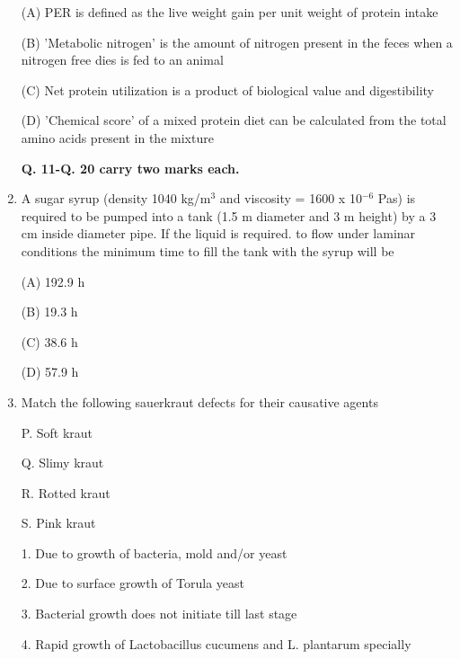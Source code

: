 \documentclass[journal]{IEEEtran}
\begin{document}
\begin{enumerate}
{(A) PER is defined as the live weight gain per unit weight of protein intake

(B) 'Metabolic nitrogen' is the amount of nitrogen present in the feces when a nitrogen free dies is fed to an animal

(C) Net protein utilization is a product of biological value and digestibility

(D) 'Chemical score' of a mixed protein diet can be calculated from the total amino acids present in the mixture}
\begin{center}
\textbf{Q. 11-Q. 20 carry two marks each.}
\end{center}
\item {A sugar syrup (density 1040 kg/m$^3$ and viscosity = 1600 x 10$^{-6}$ Pas) is required to be pumped into a tank (1.5 m diameter and 3 m height) by a 3 cm inside diameter pipe. If the liquid is required. to flow under laminar conditions the minimum time to fill the tank with the syrup will be

(A) 192.9 h

(B) 19.3 h

(C) 38.6 h

(D) 57.9 h
}
\item {Match the following sauerkraut defects for their causative agents}
\newline
	\begin{minipage}{0.5\textwidth}
	\begin{flushleft}


P. Soft kraut


Q. Slimy kraut

R. Rotted kraut

S. Pink kraut

		\end{flushleft}
		\end{minipage}
	\begin{minipage}{0.5\textwidth}
		\begin{flushleft}

1. Due to growth of bacteria, mold and/or yeast

2. Due to surface growth of Torula yeast


3. Bacterial growth does not initiate till last stage


4. Rapid growth of Lactobacillus cucumens and L. plantarum specially



		\end{flushleft}
		\end{minipage}


\end{enumerate}
\end{document}
